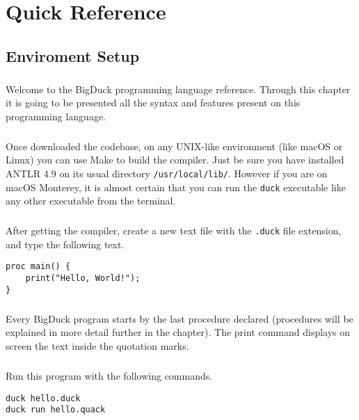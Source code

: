 
\chapter{Quick Reference}

\section{Enviroment Setup}

\paragraph{} Welcome to the BigDuck programming language reference. Through
this chapter it is going to be presented all the syntax and features present
on this programming language.

\paragraph{} Once downloaded the codebase, on any UNIX-like environment (like
macOS or Linux) you can use Make to build the compiler. Just be sure you have
installed ANTLR 4.9 on its usual directory \texttt{/usr/local/lib/}. However
if you are on macOS Monterey, it is almost certain that you can run the
\texttt{duck} executable like any other executable from the terminal.

\paragraph{} After getting the compiler, create a new text file with the
\texttt{.duck} file extension, and type the following text.
\begin{verbatim}
proc main() {
    print("Hello, World!");
}
\end{verbatim}
\paragraph{} Every BigDuck program starts by the last procedure declared
(procedures will be explained in more detail further in the chapter). The print
command displays on screen the text inside the quotation marks.

\paragraph{} Run this program with the following commands.
\begin{verbatim}
duck hello.duck
duck run hello.quack
\end{verbatim}

